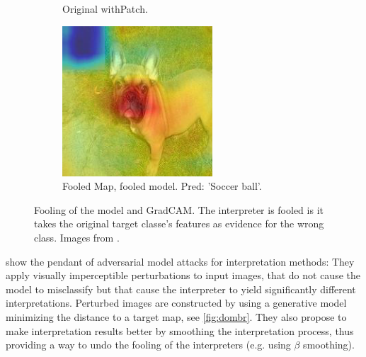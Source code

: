 \begin{figure}[ht]
\begin{subfigure}{0.32\linewidth}
      \caption{\scriptsize{Original with\newline Patch.}}
      \label{fig:patch_plus_dog}
    \end{subfigure}
    \begin{subfigure}{0.32\linewidth}
      \includegraphics[width=\linewidth]{figures/patch_fooled.png}
      \caption{\scriptsize{Fooled Map, fooled \newline model. Pred: 'Soccer ball'.}}
      \label{fig:patch_fooled}
    \end{subfigure}
    \caption{Fooling of the model and GradCAM. The interpreter is fooled is it takes the original target classe's features as evidence for the wrong class. Images from \cite{subramanya2019fooling}.}\label{fig:patch_fooling}
    \vspace{-0.3cm}
\end{figure}

\cite{dombrowski2019explanations} show the pendant of adversarial model attacks for interpretation methods: They apply visually imperceptible perturbations to input images, that do not cause the model to misclassify but that cause the interpreter to yield significantly different interpretations. Perturbed images are constructed by using a generative model minimizing the distance to a target map, see \autoref{fig:dombr}. They also propose to make interpretation results better by smoothing the interpretation process, thus providing a way to undo the fooling of the interpreters (e.g. using $\beta$ smoothing).

